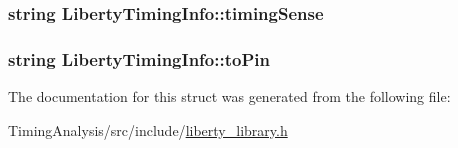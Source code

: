 \hypertarget{structLibertyTimingInfo_a54b164af0fb48cdbceb754858cbeface}{
\subsubsection[{timing\-Sense}]{\setlength{\rightskip}{0pt plus 5cm}string Liberty\-Timing\-Info\-::timing\-Sense}}\label{structLibertyTimingInfo_a54b164af0fb48cdbceb754858cbeface}
\hypertarget{structLibertyTimingInfo_a2bc2b4f64c8a8b71e314b97a37f14db4}{
\subsubsection[{to\-Pin}]{\setlength{\rightskip}{0pt plus 5cm}string Liberty\-Timing\-Info\-::to\-Pin}}\label{structLibertyTimingInfo_a2bc2b4f64c8a8b71e314b97a37f14db4}


The documentation for this struct was generated from the following file\-:\begin{DoxyCompactItemize}
\item 
Timing\-Analysis/src/include/\hyperlink{liberty__library_8h}{liberty\-\_\-library.\-h}\end{DoxyCompactItemize}
